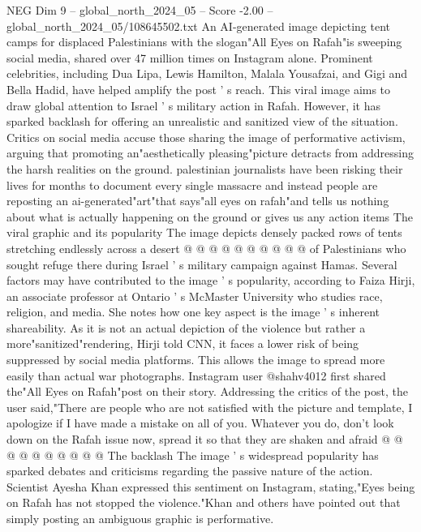\begin{textsample}{NEG Dim 9 – global\_north\_2024\_05 – Score -2.00 – global\_north\_2024\_05/108645502.txt}  \label{ex:f9_neg_164}
An AI-generated image depicting tent camps for displaced Palestinians with the slogan"All Eyes on Rafah"is sweeping social media, shared over 47 million times on Instagram alone.
Prominent celebrities, including Dua Lipa, Lewis Hamilton, Malala Yousafzai, and Gigi and Bella Hadid, have helped amplify the post ' s reach.
This viral image aims to draw global attention to Israel ' s military action in Rafah.
However, it has sparked backlash for offering an unrealistic and sanitized view of the situation.
Critics on social media accuse those sharing the image of performative activism, arguing that promoting an"aesthetically pleasing"picture detracts from addressing the harsh realities on the ground. palestinian journalists have been risking their lives for months to document every single massacre and instead people are reposting an ai-generated"art"that says"all eyes on rafah"and tells us nothing about what is actually happening on the ground or gives us any action items The viral graphic and its popularity The image depicts densely packed rows of tents stretching endlessly across a desert @ @ @ @ @ @ @ @ @ @ of Palestinians who sought refuge there during Israel ' s military campaign against Hamas.
Several factors may have contributed to the image ' s popularity, according to Faiza Hirji, an associate professor at Ontario ' s McMaster University who studies race, religion, and media.
She notes how one key aspect is the image ' s inherent shareability.
As it is not an actual depiction of the violence but rather a more"sanitized"rendering, Hirji told CNN, it faces a lower risk of being suppressed by social media platforms.
This allows the image to spread more easily than actual war photographs.
Instagram user @shahv4012 first shared the"All Eyes on Rafah"post on their story.
Addressing the critics of the post, the user said,"There are people who are not satisfied with the picture and template, I apologize if I have made a mistake on all of you.
Whatever you do, don't look down on the Rafah issue now, spread it so that they are shaken and afraid @ @ @ @ @ @ @ @ @ @ The backlash The image ' s widespread popularity has sparked debates and criticisms regarding the passive nature of the action.
Scientist Ayesha Khan expressed this sentiment on Instagram, stating,"Eyes being on Rafah has not stopped the violence."Khan and others have pointed out that simply posting an ambiguous graphic is performative.

\end{textsample}
